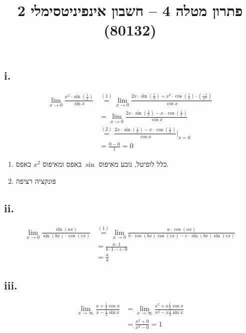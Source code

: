 
\usepackage{tikz}
\DeclareMathOperator\arcsinh{arcsinh}
\title{פתרון מטלה 4 – חשבון אינפיניטסימלי 2 (80132)}


\maketitle
\maketitleprint{}

\Question{}
\subsection{i.}
\begin{align*}
	\lim_{x \to 0} \frac{x^2 \cdot \sin(\displaystyle\frac{1}{x})}{\sin x}
	& \overset{(1)}{=} \lim_{x \to 0} \frac{2x \cdot \sin(\displaystyle\frac{1}{x}) + x^2 \cdot \cos(\frac{1}{x}) \cdot (\frac{-1}{x^2})}{\cos x} \\
	& = \lim_{x \to 0} \frac{2x \cdot \sin(\displaystyle\frac{1}{x}) - x \cdot \cos(\frac{1}{x}) }{\cos x} \\
	& \overset{(2)}{=} \frac{2x \cdot \sin(\displaystyle\frac{1}{x}) - x \cdot \cos(\frac{1}{x}) }{\cos x} \Big|_{x = 0} \\
	& = \frac{0 - 0}{1} = 0
\end{align*}
\begin{enumerate}
	\item כלל לופיטל, נובע מאיפוס $\sin$ באפס ומאיפוס $x^2$ באפס.
	\item פונקציה רציפה
\end{enumerate}

\subsection{ii.}
\begin{align*}
	\lim_{x \to 0} \frac{\sin(ax)}{\sin(bx) \cdot \cos(cx)}
	& \overset{(1)}{=} \lim_{x \to 0} \frac{a \cdot \cos(ax)}{b \cdot \cos(bx) \cos(cx) - c \cdot \sin(bx) \sin(cx)} \\
	& = \frac{a \cdot 1}{b \cdot 1 - c \cdot 0} \\
	& = \frac{a}{b}
\end{align*}

\subsection{iii.}
\begin{align*}
	\lim_{x \to \infty} \frac{x + \frac{1}{2} \cos x}{x - \frac{1}{2} \sin x}
	& = \lim_{x \to \infty} \frac{x^2 + x\frac{1}{2} \cos x}{x^2 - x\frac{1}{2} \sin x} \\
	& = \frac{x^2 + 0}{x^2 - 0} = 1
\end{align*}

